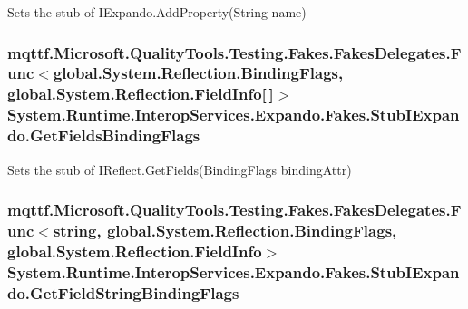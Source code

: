 Sets the stub of I\-Expando.\-Add\-Property(\-String name)

\hypertarget{class_system_1_1_runtime_1_1_interop_services_1_1_expando_1_1_fakes_1_1_stub_i_expando_aab2c2b22e98e57876adc9d798e88bc10}{
\subsubsection[{Get\-Fields\-Binding\-Flags}]{\setlength{\rightskip}{0pt plus 5cm}mqttf.\-Microsoft.\-Quality\-Tools.\-Testing.\-Fakes.\-Fakes\-Delegates.\-Func$<$global.\-System.\-Reflection.\-Binding\-Flags, global.\-System.\-Reflection.\-Field\-Info\mbox{[}$\,$\mbox{]}$>$ System.\-Runtime.\-Interop\-Services.\-Expando.\-Fakes.\-Stub\-I\-Expando.\-Get\-Fields\-Binding\-Flags}}\label{class_system_1_1_runtime_1_1_interop_services_1_1_expando_1_1_fakes_1_1_stub_i_expando_aab2c2b22e98e57876adc9d798e88bc10}


Sets the stub of I\-Reflect.\-Get\-Fields(\-Binding\-Flags binding\-Attr)

\hypertarget{class_system_1_1_runtime_1_1_interop_services_1_1_expando_1_1_fakes_1_1_stub_i_expando_a326e3a37abedb03eb2746d7f507754f8}{
\subsubsection[{Get\-Field\-String\-Binding\-Flags}]{\setlength{\rightskip}{0pt plus 5cm}mqttf.\-Microsoft.\-Quality\-Tools.\-Testing.\-Fakes.\-Fakes\-Delegates.\-Func$<$string, global.\-System.\-Reflection.\-Binding\-Flags, global.\-System.\-Reflection.\-Field\-Info$>$ System.\-Runtime.\-Interop\-Services.\-Expando.\-Fakes.\-Stub\-I\-Expando.\-Get\-Field\-String\-Binding\-Flags}}\label{class_system_1_1_runtime_1_1_interop_services_1_1_expando_1_1_fakes_1_1_stub_i_expando_a326e3a37abedb03eb2746d7f507754f8}


